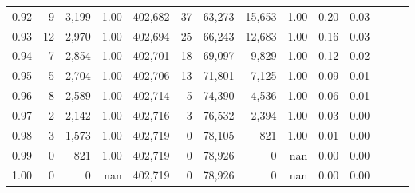 \begin{tabular}{rrrrrrrrrrrrrr}
0.92 &      9 &  3,199 &  1.00 &  402,682 &       37 &  63,273 &  15,653 &  1.00 &  0.20 &      0.03 \\
0.93 &     12 &  2,970 &  1.00 &  402,694 &       25 &  66,243 &  12,683 &  1.00 &  0.16 &      0.03 \\
0.94 &      7 &  2,854 &  1.00 &  402,701 &       18 &  69,097 &   9,829 &  1.00 &  0.12 &      0.02 \\
0.95 &      5 &  2,704 &  1.00 &  402,706 &       13 &  71,801 &   7,125 &  1.00 &  0.09 &      0.01 \\
0.96 &      8 &  2,589 &  1.00 &  402,714 &        5 &  74,390 &   4,536 &  1.00 &  0.06 &      0.01 \\
0.97 &      2 &  2,142 &  1.00 &  402,716 &        3 &  76,532 &   2,394 &  1.00 &  0.03 &      0.00 \\
0.98 &      3 &  1,573 &  1.00 &  402,719 &        0 &  78,105 &     821 &  1.00 &  0.01 &      0.00 \\
0.99 &      0 &    821 &  1.00 &  402,719 &        0 &  78,926 &       0 &   nan &  0.00 &      0.00 \\
1.00 &      0 &      0 &   nan &  402,719 &        0 &  78,926 &       0 &   nan &  0.00 &      0.00 \\
\bottomrule
\end{tabular}
